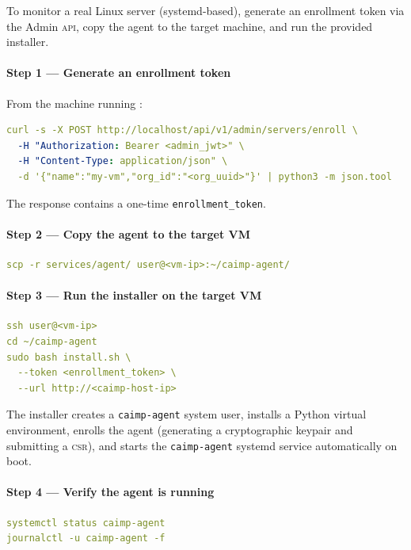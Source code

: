 To monitor a real Linux server (systemd-based), generate an enrollment token via
the Admin \textsc{api}, copy the agent to the target machine, and run the
provided installer.

\paragraph{Step 1 — Generate an enrollment token}
From the machine running \caimp{}:
\begin{lstlisting}[language=YAML]
curl -s -X POST http://localhost/api/v1/admin/servers/enroll \
  -H "Authorization: Bearer <admin_jwt>" \
  -H "Content-Type: application/json" \
  -d '{"name":"my-vm","org_id":"<org_uuid>"}' | python3 -m json.tool
\end{lstlisting}
The response contains a one-time \texttt{enrollment\_token}.

\paragraph{Step 2 — Copy the agent to the target VM}
\begin{lstlisting}[language=YAML]
scp -r services/agent/ user@<vm-ip>:~/caimp-agent/
\end{lstlisting}

\paragraph{Step 3 — Run the installer on the target VM}
\begin{lstlisting}[language=YAML]
ssh user@<vm-ip>
cd ~/caimp-agent
sudo bash install.sh \
  --token <enrollment_token> \
  --url http://<caimp-host-ip>
\end{lstlisting}

\noindent The installer creates a \texttt{caimp-agent} system user, installs a
Python virtual environment, enrolls the agent (generating a cryptographic keypair
and submitting a \textsc{csr}), and starts the \texttt{caimp-agent} systemd
service automatically on boot.

\paragraph{Step 4 — Verify the agent is running}
\begin{lstlisting}[language=YAML]
systemctl status caimp-agent
journalctl -u caimp-agent -f
\end{lstlisting}

